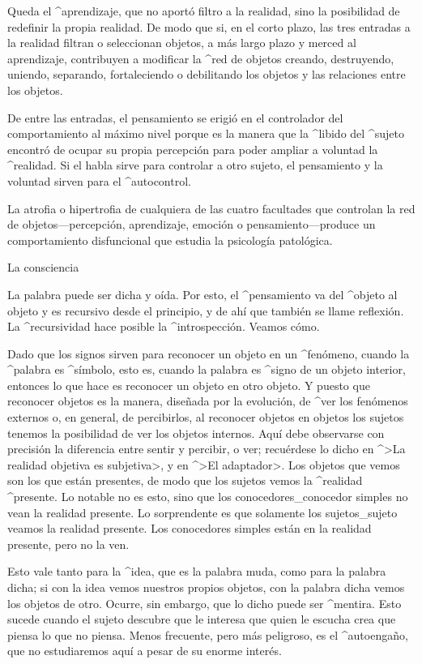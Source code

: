 Queda el ^{aprendizaje}, que no aportó filtro a la realidad, sino la
posibilidad de redefinir la propia realidad. De modo que si, en el corto
plazo, las tres entradas a la realidad filtran o seleccionan objetos, a
más largo plazo y merced al aprendizaje, contribuyen a modificar la
^{red de objetos} creando, destruyendo, uniendo, separando,
fortaleciendo o debilitando los objetos y las relaciones entre los
objetos.

De entre las entradas, el pensamiento se erigió en el controlador del
comportamiento al máximo nivel porque es la manera que la ^{libido} del
^{sujeto} encontró de ocupar su propia percepción para poder ampliar a
voluntad la ^{realidad}. Si el habla sirve para controlar a otro sujeto,
el pensamiento y la voluntad sirven para el ^{autocontrol}.

La atrofia o hipertrofia de cualquiera de las cuatro facultades que
controlan la red de objetos---percepción, aprendizaje, emoción o
pensamiento---produce un comportamiento disfuncional que estudia la
psicología patológica.


\Section La consciencia

La palabra puede ser dicha y oída. Por esto, el ^{pensamiento} va del
^{objeto} al objeto y es recursivo desde el principio, y de ahí que
también se llame reflexión. La ^{recursividad} hace posible la
^{introspección}. Veamos cómo.

Dado que los signos sirven para reconocer un objeto en un ^{fenómeno},
cuando la ^{palabra} es ^{símbolo}, esto es, cuando la palabra es
^{signo} de un objeto interior, entonces lo que hace es reconocer un
objeto en otro objeto. Y puesto que reconocer objetos es la manera,
diseñada por la evolución, de ^{ver} los fenómenos externos o, en
general, de percibirlos, al reconocer objetos en objetos los sujetos
tenemos la posibilidad de ver los objetos internos. Aquí debe observarse
con precisión la diferencia entre sentir y percibir, o ver; recuérdese
lo dicho en ^>La realidad objetiva es subjetiva>, y en ^>El adaptador>.
Los objetos que vemos son los que están presentes, de modo que los
sujetos vemos la ^{realidad} ^{presente}. Lo notable no es esto, sino
que los conocedores_{conocedor} simples no vean la realidad presente. Lo
sorprendente es que solamente los sujetos_{sujeto} veamos la realidad
presente. Los conocedores simples están en la realidad presente, pero no
la ven.

Esto vale tanto para la ^{idea}, que es la palabra muda, como para la
palabra dicha; si con la idea vemos nuestros propios objetos, con la
palabra dicha vemos los objetos de otro. Ocurre, sin embargo, que lo
dicho puede ser ^{mentira}. Esto sucede cuando el sujeto descubre que le
interesa que quien le escucha crea que piensa lo que no piensa. Menos
frecuente, pero más peligroso, es el ^{autoengaño}, que no estudiaremos
aquí a pesar de su enorme interés.

